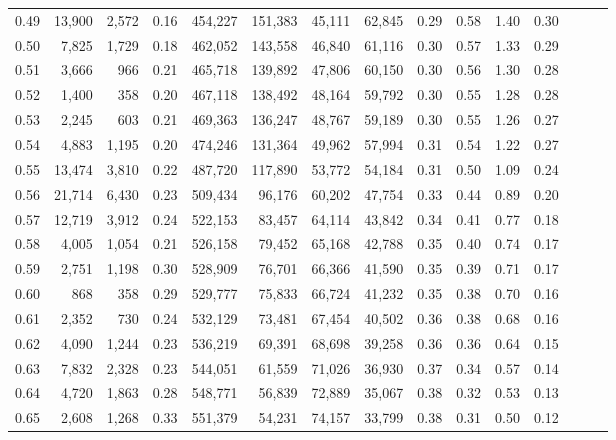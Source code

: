 \begin{tabular}{rrrrrrrrrrrrrrr}
0.49 &  13,900 &  2,572 &  0.16 &  454,227 &  151,383 &   45,111 &   62,845 &  0.29 &  0.58 &  1.40 &      0.30 \\
0.50 &   7,825 &  1,729 &  0.18 &  462,052 &  143,558 &   46,840 &   61,116 &  0.30 &  0.57 &  1.33 &      0.29 \\
0.51 &   3,666 &    966 &  0.21 &  465,718 &  139,892 &   47,806 &   60,150 &  0.30 &  0.56 &  1.30 &      0.28 \\
0.52 &   1,400 &    358 &  0.20 &  467,118 &  138,492 &   48,164 &   59,792 &  0.30 &  0.55 &  1.28 &      0.28 \\
0.53 &   2,245 &    603 &  0.21 &  469,363 &  136,247 &   48,767 &   59,189 &  0.30 &  0.55 &  1.26 &      0.27 \\
0.54 &   4,883 &  1,195 &  0.20 &  474,246 &  131,364 &   49,962 &   57,994 &  0.31 &  0.54 &  1.22 &      0.27 \\
0.55 &  13,474 &  3,810 &  0.22 &  487,720 &  117,890 &   53,772 &   54,184 &  0.31 &  0.50 &  1.09 &      0.24 \\
0.56 &  21,714 &  6,430 &  0.23 &  509,434 &   96,176 &   60,202 &   47,754 &  0.33 &  0.44 &  0.89 &      0.20 \\
0.57 &  12,719 &  3,912 &  0.24 &  522,153 &   83,457 &   64,114 &   43,842 &  0.34 &  0.41 &  0.77 &      0.18 \\
0.58 &   4,005 &  1,054 &  0.21 &  526,158 &   79,452 &   65,168 &   42,788 &  0.35 &  0.40 &  0.74 &      0.17 \\
0.59 &   2,751 &  1,198 &  0.30 &  528,909 &   76,701 &   66,366 &   41,590 &  0.35 &  0.39 &  0.71 &      0.17 \\
0.60 &     868 &    358 &  0.29 &  529,777 &   75,833 &   66,724 &   41,232 &  0.35 &  0.38 &  0.70 &      0.16 \\
0.61 &   2,352 &    730 &  0.24 &  532,129 &   73,481 &   67,454 &   40,502 &  0.36 &  0.38 &  0.68 &      0.16 \\
0.62 &   4,090 &  1,244 &  0.23 &  536,219 &   69,391 &   68,698 &   39,258 &  0.36 &  0.36 &  0.64 &      0.15 \\
0.63 &   7,832 &  2,328 &  0.23 &  544,051 &   61,559 &   71,026 &   36,930 &  0.37 &  0.34 &  0.57 &      0.14 \\
0.64 &   4,720 &  1,863 &  0.28 &  548,771 &   56,839 &   72,889 &   35,067 &  0.38 &  0.32 &  0.53 &      0.13 \\
0.65 &   2,608 &  1,268 &  0.33 &  551,379 &   54,231 &   74,157 &   33,799 &  0.38 &  0.31 &  0.50 &      0.12 \\

\end{tabular}
